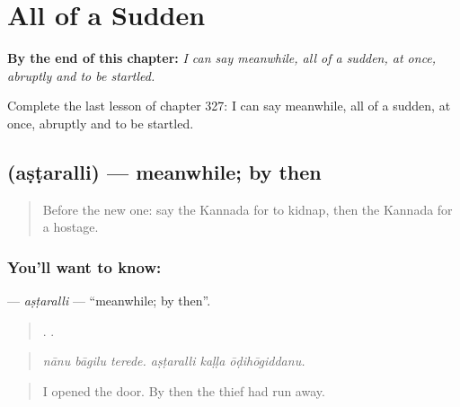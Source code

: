 
\chapter{All of a Sudden}
\label{ch:ka-all-of-a-sudden}

\begin{chapteropening}
\textbf{By the end of this chapter:} \emph{I can say meanwhile, all of a sudden, at once, abruptly and to be startled.}

Complete the last lesson of chapter 327: I can say meanwhile, all of a sudden, at once, abruptly and to be startled.
\end{chapteropening}

\section[\texorpdfstring{\kn{ಅಷ್ಟರಲ್ಲಿ} (aṣṭaralli)}{ಅಷ್ಟರಲ್ಲಿ (aṣṭaralli)}]{ (aṣṭaralli) — meanwhile; by then}

\label{lesson:KA-C327-astaralli}



\begin{quote}
Before the new one: say the Kannada for to kidnap, then the Kannada for a hostage.
\end{quote}

\subsection*{You'll want to know: }
\textbf{} — \emph{aṣṭaralli} — \textquotedblleft{}meanwhile; by then\textquotedblright{}.

\begin{quote}
  .   .
\end{quote}

\begin{quote}
\emph{nānu bāgilu terede. aṣṭaralli kaḷḷa ōḍihōgiddanu.}
\end{quote}

\begin{quote}
I opened the door. By then the thief had run away.
\end{quote}

